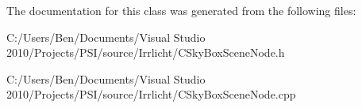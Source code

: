 The documentation for this class was generated from the following files\-:\begin{DoxyCompactItemize}
\item 
C\-:/\-Users/\-Ben/\-Documents/\-Visual Studio 2010/\-Projects/\-P\-S\-I/source/\-Irrlicht/C\-Sky\-Box\-Scene\-Node.\-h\item 
C\-:/\-Users/\-Ben/\-Documents/\-Visual Studio 2010/\-Projects/\-P\-S\-I/source/\-Irrlicht/C\-Sky\-Box\-Scene\-Node.\-cpp\end{DoxyCompactItemize}
